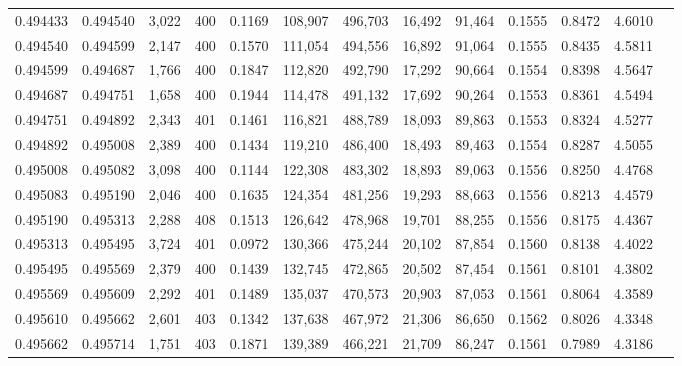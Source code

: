 \begin{tabular}{rrrrrrrrrrrrr}
0.494433 & 0.494540 & 3,022 & 400 &                                     0.1169 & 108,907 & 496,703 &  16,492 &  91,464 & 0.1555 & 0.8472 & 4.6010 \\
0.494540 & 0.494599 & 2,147 & 400 &                                     0.1570 & 111,054 & 494,556 &  16,892 &  91,064 & 0.1555 & 0.8435 & 4.5811 \\
0.494599 & 0.494687 & 1,766 & 400 &                                     0.1847 & 112,820 & 492,790 &  17,292 &  90,664 & 0.1554 & 0.8398 & 4.5647 \\
0.494687 & 0.494751 & 1,658 & 400 &                                     0.1944 & 114,478 & 491,132 &  17,692 &  90,264 & 0.1553 & 0.8361 & 4.5494 \\
0.494751 & 0.494892 & 2,343 & 401 &                                     0.1461 & 116,821 & 488,789 &  18,093 &  89,863 & 0.1553 & 0.8324 & 4.5277 \\
0.494892 & 0.495008 & 2,389 & 400 &                                     0.1434 & 119,210 & 486,400 &  18,493 &  89,463 & 0.1554 & 0.8287 & 4.5055 \\
0.495008 & 0.495082 & 3,098 & 400 &                                     0.1144 & 122,308 & 483,302 &  18,893 &  89,063 & 0.1556 & 0.8250 & 4.4768 \\
0.495083 & 0.495190 & 2,046 & 400 &                                     0.1635 & 124,354 & 481,256 &  19,293 &  88,663 & 0.1556 & 0.8213 & 4.4579 \\
0.495190 & 0.495313 & 2,288 & 408 &                                     0.1513 & 126,642 & 478,968 &  19,701 &  88,255 & 0.1556 & 0.8175 & 4.4367 \\
0.495313 & 0.495495 & 3,724 & 401 &                                     0.0972 & 130,366 & 475,244 &  20,102 &  87,854 & 0.1560 & 0.8138 & 4.4022 \\
0.495495 & 0.495569 & 2,379 & 400 &                                     0.1439 & 132,745 & 472,865 &  20,502 &  87,454 & 0.1561 & 0.8101 & 4.3802 \\
0.495569 & 0.495609 & 2,292 & 401 &                                     0.1489 & 135,037 & 470,573 &  20,903 &  87,053 & 0.1561 & 0.8064 & 4.3589 \\
0.495610 & 0.495662 & 2,601 & 403 &                                     0.1342 & 137,638 & 467,972 &  21,306 &  86,650 & 0.1562 & 0.8026 & 4.3348 \\
0.495662 & 0.495714 & 1,751 & 403 &                                     0.1871 & 139,389 & 466,221 &  21,709 &  86,247 & 0.1561 & 0.7989 & 4.3186 \\

\end{tabular}
